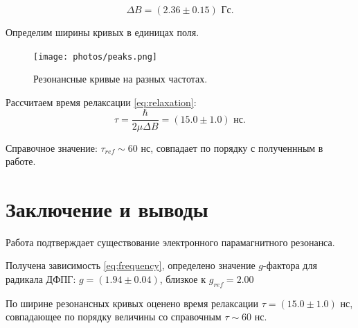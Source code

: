 \documentclass[12pt,a4paper]{article}
\begin{document}
	$$ \Delta B = (2.36 \pm 0.15) \text{ Гс}. $$
	
	Определим ширины кривых в единицах поля.
	\begin{figure}[H]
		\centering
		\texttt{[image: photos/peaks.png]}
		\caption{Резонансные кривые на разных частотах.}
		\label{fig:peaks}
	\end{figure}
	
	Рассчитаем время релаксации \eqref{eq:relaxation}:
	$$ \tau = \frac{\hbar}{2 \mu \Delta B} = (15.0 \pm 1.0) \text{ нс}. $$
	
	Справочное значение: $ \tau_{ref} \sim 60 \text{ нс}$, совпадает по порядку с полученнным в работе.
	\section*{Заключение и выводы}
	
	Работа подтверждает существование электронного парамагнитного резонанса.
	
	Получена зависимость \eqref{eq:frequency}, определено значение $g$-фактора для радикала ДФПГ: $g = (1.94 \pm 0.04)$, близкое к $g_{ref} = 2.00$
	
	По ширине резонансных кривых оценено время релаксации $\tau = (15.0 \pm 1.0)$ нс, совпадающее по порядку величины со справочным $\tau \sim 60$ нс.
	
\end{document}
